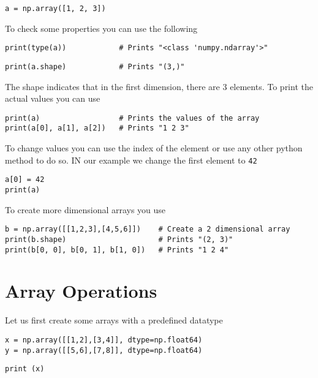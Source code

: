 \begin{lstlisting}
a = np.array([1, 2, 3])   
\end{lstlisting}

To check some properties you can use the following

\begin{lstlisting}
print(type(a))            # Prints "<class 'numpy.ndarray'>"
\end{lstlisting}

\begin{lstlisting}
print(a.shape)            # Prints "(3,)"
\end{lstlisting}

The shape indicates that in the first dimension, there are 3 elements.
To print the actual values you can use

\begin{lstlisting}
print(a)                  # Prints the values of the array
print(a[0], a[1], a[2])   # Prints "1 2 3"
\end{lstlisting}

To change values you can use the index of the element or use any other
python method to do so. IN our example we change the first element to
\texttt{42}

\begin{lstlisting}
a[0] = 42                 
print(a)                  
\end{lstlisting}

To create more dimensional arrays you use

\begin{lstlisting}
b = np.array([[1,2,3],[4,5,6]])    # Create a 2 dimensional array
print(b.shape)                     # Prints "(2, 3)"
print(b[0, 0], b[0, 1], b[1, 0])   # Prints "1 2 4"
\end{lstlisting}

\section{Array Operations}\label{array-operations}

Let us first create some arrays with a predefined datatype

\begin{lstlisting}
x = np.array([[1,2],[3,4]], dtype=np.float64)
y = np.array([[5,6],[7,8]], dtype=np.float64)
\end{lstlisting}

\begin{lstlisting}
print (x)
\end{lstlisting}

